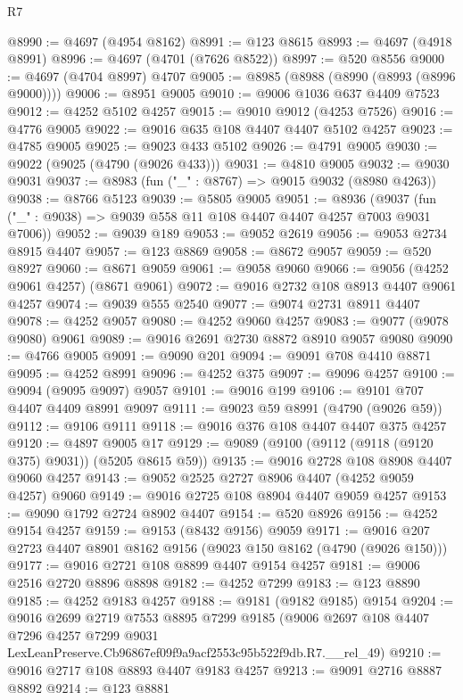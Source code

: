 \begin{lexlean}{R7}
\begin{coremodule}
@8990 := @4697 (@4954 @8162)
@8991 := @123 @8615
@8993 := @4697 (@4918 @8991)
@8996 := @4697 (@4701 (@7626 @8522))
@8997 := @520 @8556
@9000 := @4697 (@4704 @8997) @4707
@9005 := @8985 (@8988 (@8990 (@8993 (@8996 @9000))))
@9006 := @8951 @9005
@9010 := @9006 @1036 @637 @4409 @7523
@9012 := @4252 @5102 @4257
@9015 := @9010 @9012 (@4253 @7526)
@9016 := @4776 @9005
@9022 := @9016 @635 @108 @4407 @4407 @5102 @4257
@9023 := @4785 @9005
@9025 := @9023 @433 @5102
@9026 := @4791 @9005
@9030 := @9022 (@9025 (@4790 (@9026 @433)))
@9031 := @4810 @9005
@9032 := @9030 @9031
@9037 := @8983 (fun ("_" : @8767) => @9015 @9032 (@8980 @4263))
@9038 := @8766 @5123
@9039 := @5805 @9005
@9051 := @8936
    (@9037 (fun ("_" : @9038) => @9039 @558 @11 @108 @4407 @4407 @4257 @7003 @9031 @7006))
@9052 := @9039 @189
@9053 := @9052 @2619
@9056 := @9053 @2734 @8915 @4407
@9057 := @123 @8869
@9058 := @8672 @9057
@9059 := @520 @8927
@9060 := @8671 @9059
@9061 := @9058 @9060
@9066 := @9056 (@4252 @9061 @4257) (@8671 @9061)
@9072 := @9016 @2732 @108 @8913 @4407 @9061 @4257
@9074 := @9039 @555 @2540
@9077 := @9074 @2731 @8911 @4407
@9078 := @4252 @9057
@9080 := @4252 @9060 @4257
@9083 := @9077 (@9078 @9080) @9061
@9089 := @9016 @2691 @2730 @8872 @8910 @9057 @9080
@9090 := @4766 @9005
@9091 := @9090 @201
@9094 := @9091 @708 @4410 @8871
@9095 := @4252 @8991
@9096 := @4252 @375
@9097 := @9096 @4257
@9100 := @9094 (@9095 @9097) @9057
@9101 := @9016 @199
@9106 := @9101 @707 @4407 @4409 @8991 @9097
@9111 := @9023 @59 @8991 (@4790 (@9026 @59))
@9112 := @9106 @9111
@9118 := @9016 @376 @108 @4407 @4407 @375 @4257
@9120 := @4897 @9005 @17
@9129 := @9089 (@9100 (@9112 (@9118 (@9120 @375) @9031)) (@5205 @8615 @59))
@9135 := @9016 @2728 @108 @8908 @4407 @9060 @4257
@9143 := @9052 @2525 @2727 @8906 @4407 (@4252 @9059 @4257) @9060
@9149 := @9016 @2725 @108 @8904 @4407 @9059 @4257
@9153 := @9090 @1792 @2724 @8902 @4407
@9154 := @520 @8926
@9156 := @4252 @9154 @4257
@9159 := @9153 (@8432 @9156) @9059
@9171 := @9016 @207 @2723 @4407 @8901 @8162 @9156 (@9023 @150 @8162 (@4790 (@9026 @150)))
@9177 := @9016 @2721 @108 @8899 @4407 @9154 @4257
@9181 := @9006 @2516 @2720 @8896 @8898
@9182 := @4252 @7299
@9183 := @123 @8890
@9185 := @4252 @9183 @4257
@9188 := @9181 (@9182 @9185) @9154
@9204 := @9016
    @2699
    @2719
    @7553
    @8895
    @7299
    @9185
    (@9006
      @2697
      @108
      @4407
      @7296
      @4257
      @7299
      @9031
      LexLeanPreserve.Cb96867ef09f9a9acf2553c95b522f9db.R7.__rel_49)
@9210 := @9016 @2717 @108 @8893 @4407 @9183 @4257
@9213 := @9091 @2716 @8887 @8892
@9214 := @123 @8881

\end{coremodule}
\end{lexlean}
